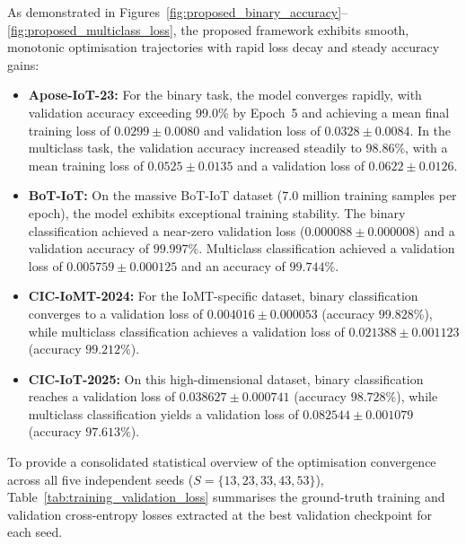 \documentclass[a4paper,fleqn]{cas-sc}
\begin{document}
As demonstrated in Figures~\ref{fig:proposed_binary_accuracy}--\ref{fig:proposed_multiclass_loss}, the proposed framework exhibits smooth, monotonic optimisation trajectories with rapid loss decay and steady accuracy gains:
\begin{itemize}
    \item \textbf{Apose-IoT-23:} For the binary task, the model converges rapidly, with validation accuracy exceeding 99.0\% by Epoch~5 and achieving a mean final training loss of $0.0299 \pm 0.0080$ and validation loss of $0.0328 \pm 0.0084$. In the multiclass task, the validation accuracy increased steadily to $98.86\%$, with a mean training loss of $0.0525 \pm 0.0135$ and a validation loss of $0.0622 \pm 0.0126$.
    \item \textbf{BoT-IoT:} On the massive BoT-IoT dataset (7.0 million training samples per epoch), the model exhibits exceptional training stability. The binary classification achieved a near-zero validation loss ($0.000088 \pm 0.000008$) and a validation accuracy of $99.997\%$. Multiclass classification achieved a validation loss of $0.005759 \pm 0.000125$ and an accuracy of $99.744\%$.
    \item \textbf{CIC-IoMT-2024:} For the IoMT-specific dataset, binary classification converges to a validation loss of $0.004016 \pm 0.000053$ (accuracy $99.828\%$), while multiclass classification achieves a validation loss of $0.021388 \pm 0.001123$ (accuracy $99.212\%$).
    \item \textbf{CIC-IoT-2025:} On this high-dimensional dataset, binary classification reaches a validation loss of $0.038627 \pm 0.000741$ (accuracy $98.728\%$), while multiclass classification yields a validation loss of $0.082544 \pm 0.001079$ (accuracy $97.613\%$).
\end{itemize}

To provide a consolidated statistical overview of the optimisation convergence across all five independent seeds ($S=\{13, 23, 33, 43, 53\}$), Table~\ref{tab:training_validation_loss} summarises the ground-truth training and validation cross-entropy losses extracted at the best validation checkpoint for each seed.
\end{document}
